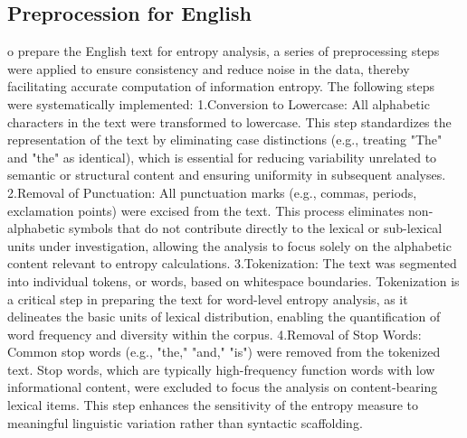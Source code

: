 \documentclass[12pt]{article}
\begin{document}
\subsection*{\centering Preprocession for English}
o prepare the English text for entropy analysis, a series of preprocessing steps were applied to ensure consistency and reduce noise in the data, thereby facilitating accurate computation of information entropy. The following steps were systematically implemented:
1.Conversion to Lowercase: All alphabetic characters in the text were transformed to lowercase. This step standardizes the representation of the text by eliminating case distinctions (e.g., treating "The" and "the" as identical), which is essential for reducing variability unrelated to semantic or structural content and ensuring uniformity in subsequent analyses.
2.Removal of Punctuation: All punctuation marks (e.g., commas, periods, exclamation points) were excised from the text. This process eliminates non-alphabetic symbols that do not contribute directly to the lexical or sub-lexical units under investigation, allowing the analysis to focus solely on the alphabetic content relevant to entropy calculations.
3.Tokenization: The text was segmented into individual tokens, or words, based on whitespace boundaries. Tokenization is a critical step in preparing the text for word-level entropy analysis, as it delineates the basic units of lexical distribution, enabling the quantification of word frequency and diversity within the corpus.
4.Removal of Stop Words: Common stop words (e.g., "the," "and," "is") were removed from the tokenized text. Stop words, which are typically high-frequency function words with low informational content, were excluded to focus the analysis on content-bearing lexical items. This step enhances the sensitivity of the entropy measure to meaningful linguistic variation rather than syntactic scaffolding.
\end{document}
